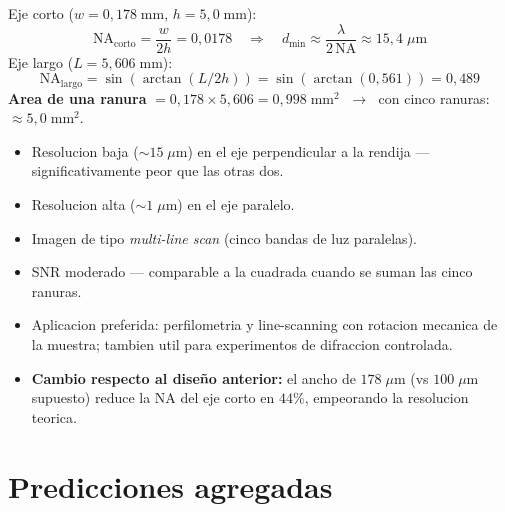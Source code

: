 \documentclass[11pt,a4paper,oneside]{report}
\begin{document}
\begin{calculo}
Eje corto ($w = 0{,}178\;\mathrm{mm}$, $h = 5{,}0\;\mathrm{mm}$):
\[
\mathrm{NA}_{\text{corto}} = \frac{w}{2h} = 0{,}0178 \quad\Rightarrow\quad
d_{\min} \approx \frac{\lambda}{2\,\mathrm{NA}} \approx 15{,}4\;\mu\mathrm{m}
\]
Eje largo ($L = 5{,}606\;\mathrm{mm}$):
\[
\mathrm{NA}_{\text{largo}} = \sin(\arctan(L/2h)) = \sin(\arctan(0{,}561)) = 0{,}489
\]
\textbf{Area de una ranura} $= 0{,}178 \times 5{,}606 = 0{,}998\;\mathrm{mm}^2$
$\;\to\;$ con cinco ranuras: $\approx 5{,}0\;\mathrm{mm}^2$.
\end{calculo}

\begin{hipotesis}
\begin{itemize}[leftmargin=1.5em]
  \item Resolucion baja ($\sim 15\;\mu$m) en el eje perpendicular a la rendija
        --- significativamente peor que las otras dos.
  \item Resolucion alta ($\sim 1\;\mu$m) en el eje paralelo.
  \item Imagen de tipo \emph{multi-line scan} (cinco bandas de luz paralelas).
  \item SNR moderado --- comparable a la cuadrada cuando se suman las cinco ranuras.
  \item Aplicacion preferida: perfilometria y line-scanning con rotacion mecanica
        de la muestra; tambien util para experimentos de difraccion controlada.
  \item \textbf{Cambio respecto al diseño anterior:} el ancho de $178\;\mu$m
        (vs $100\;\mu$m supuesto) reduce la NA del eje corto en $44\%$,
        empeorando la resolucion teorica.
\end{itemize}
\end{hipotesis}

\section{Predicciones agregadas}
\end{document}
